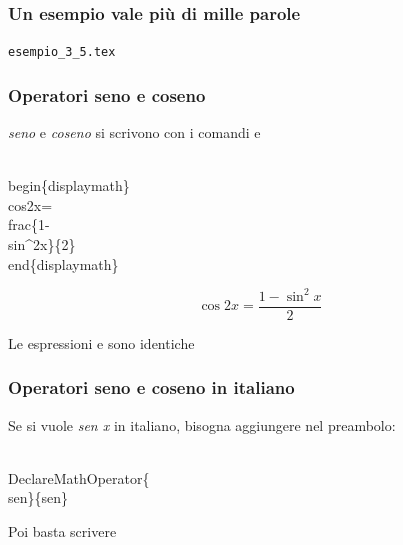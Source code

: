\documentclass[svgnames,%
	ucs,%
	pdftex]{guitbeamer}
\begin{document}
\begin{frame}
  \frametitle{Un esempio vale pi\`u di mille parole}
	\begin{center}
		\alert{\texttt{esempio\_3\_5.tex}}
	\end{center}
\end{frame}
\begin{frame}
  \frametitle{Operatori seno e coseno}
	\emph{seno} e \emph{coseno} si scrivono con i comandi  e  
	\begin{LaTeXcode}
		\\begin\{displaymath\}\n
		\hspace*{5ex}\alert{\\cos}2x=\\frac\{1-\alert{\\sin}\textasciicircum2x\}\{2\}\n
		\\end\{displaymath\}
	\end{LaTeXcode}
	\begin{LaTeXoutput}
		\begin{displaymath}
			\cos2x=\frac{1-\sin^2x}{2}
		\end{displaymath} 
	\end{LaTeXoutput}
  \bigskip
	\medskip Le espressioni  e   sono identiche
\end{frame}
\begin{frame}
  \frametitle{Operatori seno e coseno in italiano}
	Se si vuole \emph{sen x} in italiano, bisogna aggiungere nel preambolo: 
	\begin{LaTeXcode}
		\\DeclareMathOperator\{\\sen\}\{sen\}
	\end{LaTeXcode}
	\medskip Poi basta scrivere  
\end{frame}
\end{document}

